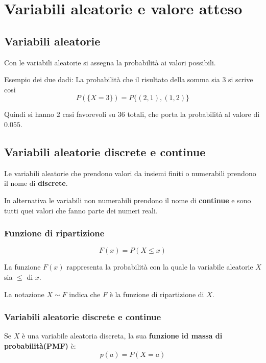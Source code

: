 \chapter{Variabili aleatorie e valore atteso}

\section{Variabili aleatorie}

Con le variabili aleatorie si assegna la probabilit\`{a} ai valori possibili. 

Esempio dei due dadi: 
La probabilit\`{a} che il risultato della somma sia 3 si scrive cos\`{i}
\begin{equation}
   P(\{X = 3\}) = P\{(2,1),(1,2)\} 
\end{equation}

Quindi si hanno 2 casi favorevoli su 36 totali, che porta la probabilit\`{a} al valore di $0.055$. 

\section{Variabili aleatorie discrete e continue}

Le variabili aleatorie che prendono valori da insiemi finiti o numerabili prendono il nome di \textbf{discrete}. 

In alternativa le variabili non numerabili prendono il nome di \textbf{continue} e sono tutti quei valori 
che fanno parte dei numeri reali. 

\subsection{Funzione di ripartizione}

\begin{equation}
   F(x) = P(X \leq x) 
\end{equation}

La funzione $F(x)$ rappresenta la probabilit\`{a} con la quale la variabile aleatorie $X$ sia $\leq$ di $x$. 

La notazione $X \sim F$ indica che $F$ \`{e} la funzione di ripartizione di $X$. 

\subsection{Variabili aleatorie discrete e continue}
Se $X$ \`{e} una variabile aleatoria discreta, la sua \textbf{funzione id massa di probabilit\`{a}(PMF)} \`{e}: 
\begin{equation}
   p(a) = P(X=a) 
\end{equation}


